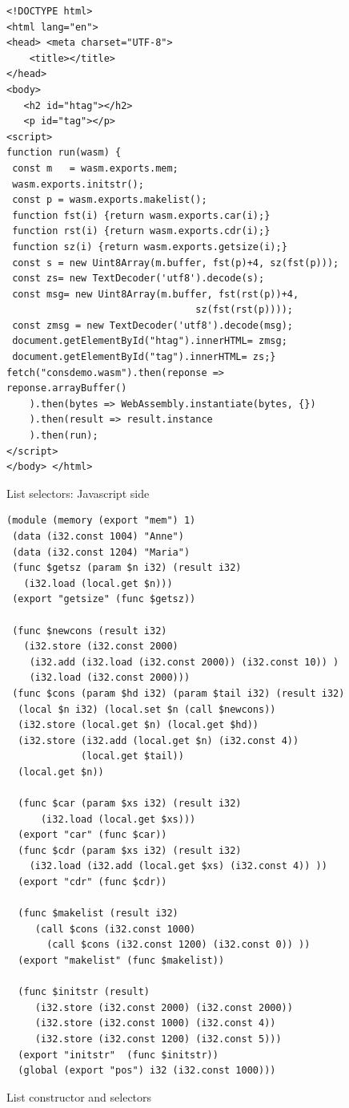\documentclass[a4paper,12pt]{book}
\begin{document}
\begin{figure}[!h]
\begin{verbatim}
<!DOCTYPE html>
<html lang="en">
<head> <meta charset="UTF-8">
    <title></title>
</head>
<body>
   <h2 id="htag"></h2>
   <p id="tag"></p>   
<script>
function run(wasm) {
 const m   = wasm.exports.mem;
 wasm.exports.initstr();
 const p = wasm.exports.makelist();
 function fst(i) {return wasm.exports.car(i);}
 function rst(i) {return wasm.exports.cdr(i);}
 function sz(i) {return wasm.exports.getsize(i);}
 const s = new Uint8Array(m.buffer, fst(p)+4, sz(fst(p)));
 const zs= new TextDecoder('utf8').decode(s);
 const msg= new Uint8Array(m.buffer, fst(rst(p))+4,
                                 sz(fst(rst(p))));
 const zmsg = new TextDecoder('utf8').decode(msg);
 document.getElementById("htag").innerHTML= zmsg;
 document.getElementById("tag").innerHTML= zs;}
fetch("consdemo.wasm").then(reponse => reponse.arrayBuffer()
    ).then(bytes => WebAssembly.instantiate(bytes, {})
    ).then(result => result.instance
    ).then(run);
</script>
</body> </html>
\end{verbatim}

\caption{List selectors: Javascript side}
  \label{wasm:selectors}
\end{figure}


\begin{figure}[!t]
  \begin{verbatim}
(module (memory (export "mem") 1)
 (data (i32.const 1004) "Anne")
 (data (i32.const 1204) "Maria")
 (func $getsz (param $n i32) (result i32)
   (i32.load (local.get $n)))
 (export "getsize" (func $getsz))
  
 (func $newcons (result i32)
   (i32.store (i32.const 2000)
    (i32.add (i32.load (i32.const 2000)) (i32.const 10)) )
    (i32.load (i32.const 2000))) 
 (func $cons (param $hd i32) (param $tail i32) (result i32)
  (local $n i32) (local.set $n (call $newcons))
  (i32.store (local.get $n) (local.get $hd))
  (i32.store (i32.add (local.get $n) (i32.const 4))
             (local.get $tail))
  (local.get $n))

  (func $car (param $xs i32) (result i32)
      (i32.load (local.get $xs)))
  (export "car" (func $car))
  (func $cdr (param $xs i32) (result i32)
    (i32.load (i32.add (local.get $xs) (i32.const 4)) ))
  (export "cdr" (func $cdr))

  (func $makelist (result i32)
     (call $cons (i32.const 1000)
       (call $cons (i32.const 1200) (i32.const 0)) ))
  (export "makelist" (func $makelist))

  (func $initstr (result)
     (i32.store (i32.const 2000) (i32.const 2000))
     (i32.store (i32.const 1000) (i32.const 4))
     (i32.store (i32.const 1200) (i32.const 5)))
  (export "initstr"  (func $initstr))
  (global (export "pos") i32 (i32.const 1000)))
  \end{verbatim}
  \caption{List constructor and selectors}
  \label{wasm:cons}
\end{figure}
\end{document}
